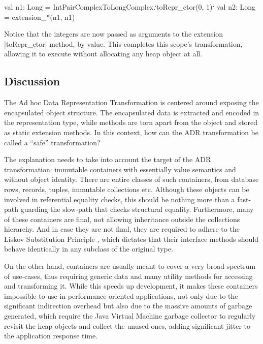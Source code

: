 \begin{lstlisting-nobreak}
val n1: Long = IntPairComplexToLongComplex.`toRepr_ctor(0, 1)`
val n2: Long = extension_*(n1, n1)
\end{lstlisting-nobreak}

Notice that the integers are now passed as arguments to the extension |toRepr_ctor| method, by value. This completes this scope's transformation, allowing it to execute without allocating any heap object at all.



\subsection{Discussion}
\label{sec:ildl:discussion}
The Ad hoc Data Representation Transformation is centered around exposing the encapsulated object structure. The encapsulated data is extracted and encoded in the representation type, while methods are torn apart from the object and stored as static extension methods. In this context, how can the ADR transformation be called a ``safe'' transformation?

The explanation needs to take into account the target of the ADR transformation: immutable containers with essentially value semantics and without object identity. There are entire classes of such containers, from database rows, records, tuples, immutable collections etc. Although these objects can be involved in referential equality checks, this should be nothing more than a fast-path guarding the slow-path that checks structural equality. Furthermore, many of these containers are final, not allowing inheritance outside the collections hierarchy. And in case they are not final, they are required to adhere to the Liskov Substitution Principle \cite{liskov-substitution-principle}, which dictates that their interface methods should behave identically in any subclass of the original type.

On the other hand, containers are usually meant to cover a very broad spectrum of use-cases, thus requiring generic data and many utility methods for accessing and transforming it. While this speeds up development, it makes these containers impossible to use in performance-oriented applications, not only due to the significant indirection overhead but also due to the massive amounts of garbage generated, which require the Java Virtual Machine garbage collector to regularly revisit the heap objects and collect the unused ones, adding significant jitter to the application response time.

